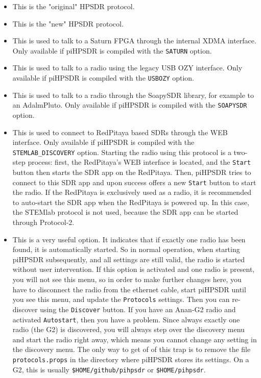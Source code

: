 \documentclass[12pt]{book}
\def\rett#1{\texttt{\color{red}#1}}
\def\pH{pi\-HPSDR\xspace}
\begin{document}
\begin{itemize}[font=\texttt, left=80pt]
\item[Protocol 1]{This is the "original" HPSDR protocol.}
\item[Protocol 2]{This is the "new" HPSDR protocol.}
\item[Saturn XDMA]{This is used to talk to a Saturn FPGA through the internal XDMA interface. Only available
if \pH is compiled with the \texttt{SATURN}  option.}
\item[USB OZY]{This is used to talk to a radio using the legacy USB OZY interface. Only available if \pH
is compiled with the \texttt{USBOZY} option.}
\item[SoapySDR]{This is used to talk to a radio through the SoapySDR library, for example to an AdalmPluto.
Only available if \pH is compiled with the \texttt{SOAPYSDR} option.}
\item[STEMlab]{This is used to connect to RedPitaya based SDRs through the WEB interface. Only available if
\pH is compiled with the \texttt{STEMLAB\_DISCOVERY} option. Starting the radio using this protocol is a
two-step process:
first, the RedPitaya's WEB interface is located, and the \texttt{Start} button then starts the SDR app
on the RedPitaya. Then, \pH tries to connect to this SDR app and upon success offers a new
\texttt{Start} button to start the radio. If the RedPitaya is exclusively used as a radio, it is recommended
to auto-start the SDR app
when the RedPitaya is powered up. In this case, the STEMlab protocol is not used, because the SDR app can be started through Protocol-2.}
\item[Autostart]{This is a very useful option. It indicates that if exactly one radio has been found, it is
automatically started. So in normal operation, when starting \pH subsequently, and all settings are
still valid, the radio is started without user intervention. If this option is activated and one radio is
present, you will not see this menu, so in order to make further changes here, you have to disconnect the
radio from the ethernet cable, start \pH until you see this menu, and update the \rett{Protocols}
settings. Then you can re-discover using the \rett{Discover} button.
If you have an Anan-G2 radio and activated \texttt{Autostart}, then you have a problem. Since always
exactly one radio (the G2) is discovered, you will always step over the discovery menu and start the
radio right away, which means you cannot change any setting in the discovery menu. The only way
to get of of this trap is to remove the file \texttt{protocols.props} in the directory where \pH
stores its settings. On a G2, this is usually \texttt{\$HOME/github/pihpsdr} or \texttt{\$HOME/pihpsdr}.

}
\end{itemize}
\end{document}
